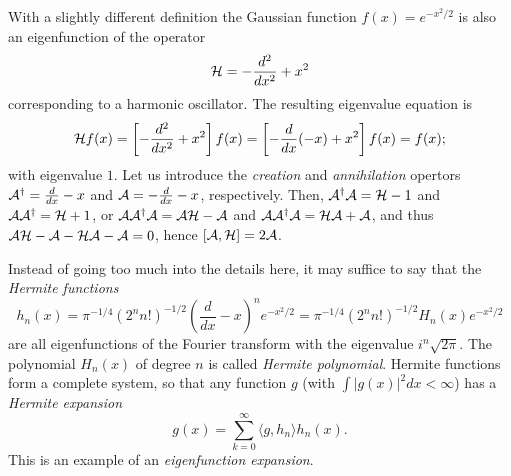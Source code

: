 With a slightly different definition the Gaussian function $f(x) = e^{-{x^2/2}}$ is also an eigenfunction of the operator
\begin{equation}
{\cal H} = - \frac{d^2}{d x^2} + x ^2
\label{2012-m-ch-fa-hphoe}
\end{equation}
corresponding to a harmonic oscillator.
The resulting eigenvalue equation is
\begin{equation}
{\cal H} f(x) = \left[- \frac{d^2}{d x^2} +  x^2 \right] f(x) = \left[- \frac{d }{d x }(-  x) +  x^2 \right] f(x) =  f(x);
\label{2012-m-ch-fa-hphoeee}
\end{equation}
with eigenvalue $1$.
Let us introduce the
{\em creation}
and
{\em annihilation}
opertors
${\cal A}^\dagger =  \frac{d}{d x} -  x$
and
${\cal A}  =  - \frac{d}{d x} -  x$,
respectively.
Then,
${\cal A}^\dagger {\cal A}= {\cal H} -1$ and
${\cal A} {\cal A}^\dagger = {\cal H} +1$,
or
${\cal A}{\cal A}^\dagger {\cal A}= {\cal A}{\cal H} -{\cal A}$ and
${\cal A} {\cal A}^\dagger {\cal A}= {\cal H}{\cal A} +{\cal A}$,
and thus
$ {\cal A}{\cal H} -{\cal A} - {\cal H}{\cal A} - {\cal A} = 0$,
hence
$ [{\cal A},{\cal H}] = 2{\cal A}$.
\fi

Instead of going too much into the details here, it may suffice to say
that the
{\em Hermite functions}
\begin{equation}
h_n(x) =\pi^{-1/4}(2^n n!)^{-1/2}\left(  \frac{d}{dx} -x\right)^n e^{-{x^2/2}}
= \pi^{-1/4}(2^n n!)^{-1/2} H_n(x) e^{-{x^2/2}}
\end{equation}
are all eigenfunctions of the Fourier transform with the eigenvalue $i^n \sqrt{2\pi }$.
The polynomial $H_n(x)$ of degree $n$ is called {\em Hermite polynomial}. 
Hermite functions form a complete system, so that any function $g$ (with $\int \vert g (x) \vert^2 dx <\infty$) has a
{\em Hermite expansion}
\begin{equation}
g(x) = \sum_{k=0}^\infty \langle g , h_n\rangle h_n(x)
.
\end{equation}
This is an example of an
{\em eigenfunction expansion}.
